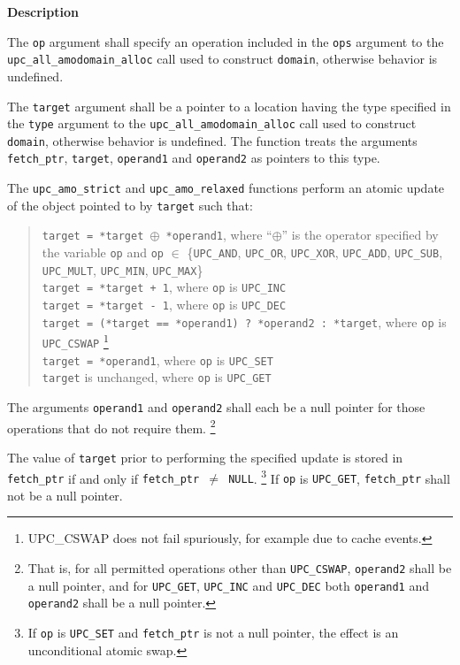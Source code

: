 {\bf Description}

\np The {\tt op} argument shall specify an operation included in the {\tt ops}
    argument to the {\tt upc\_all\_amodomain\_alloc} call used to construct
    {\tt domain}, otherwise behavior is undefined.

\np The {\tt target} argument shall be a pointer to a location having the type
    specified in the {\tt type} argument to the {\tt upc\_all\_amodomain\_alloc} 
    call used to construct {\tt domain}, otherwise behavior is undefined. 
    The function treats the arguments {\tt fetch\_ptr}, {\tt target}, 
    {\tt operand1} and {\tt operand2} as pointers to this type.

\np The {\tt upc\_amo\_strict} and {\tt upc\_amo\_relaxed} functions perform
    an atomic update of the object pointed to by {\tt target} such that:

    \begin{verse}
      {\tt *target = *target $\oplus$ *operand1},
        where ``$\oplus$'' is the operator specified by the variable {\tt op}
        and {\tt op} $\in$ \{{\tt UPC\_AND}, {\tt UPC\_OR}, {\tt UPC\_XOR},
        {\tt UPC\_ADD}, {\tt UPC\_SUB}, {\tt UPC\_MULT}, {\tt UPC\_MIN}, {\tt UPC\_MAX}\} \\
      {\tt *target = *target + 1}, 
        where {\tt op} is {\tt UPC\_INC} \\
      {\tt *target = *target - 1}, 
        where {\tt op} is {\tt UPC\_DEC} \\
      {\tt *target = (*target == *operand1) ? *operand2 : *target},
        where {\tt op} is {\tt UPC\_CSWAP}%
        \footnote{UPC\_CSWAP does not fail spuriously, for example due to cache events.} \\
      {\tt *target = *operand1},
        where {\tt op} is {\tt UPC\_SET} \\
      {\tt *target} is unchanged,
        where {\tt op} is {\tt UPC\_GET} \\
    \end{verse}

\np The arguments {\tt operand1} and {\tt operand2} shall each be a null
    pointer for those operations that do not require them.%
    \footnote{That is, for all permitted operations other than {\tt UPC\_CSWAP},
    {\tt operand2} shall be a null pointer, and for {\tt UPC\_GET}, {\tt UPC\_INC} and {\tt UPC\_DEC}
    both {\tt operand1} and {\tt operand2} shall be a null pointer.}

\np The value of {\tt *target} prior to performing
    the specified update is stored in {\tt *fetch\_ptr} if and only if
    {\tt fetch\_ptr $\neq$ NULL}.%
    \footnote{If {\tt op} is {\tt UPC\_SET} and {\tt fetch\_ptr} is
    not a null pointer, the effect is an unconditional atomic swap.}
    If {\tt op} is {\tt UPC\_GET}, {\tt fetch\_ptr} shall not be a null pointer.

